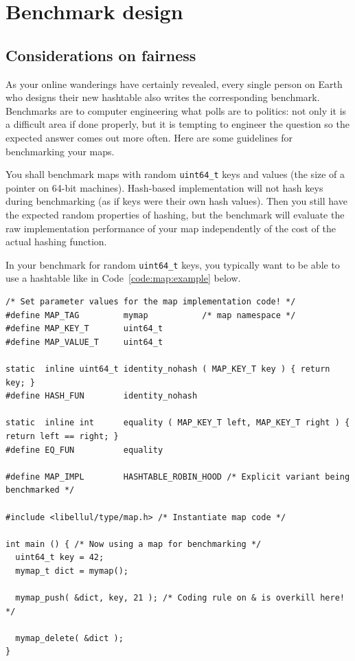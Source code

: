 \chapter{Benchmark design}\label{chap:map:benchmark}

\section*{Considerations on fairness}

As your online wanderings have certainly revealed, every single person on Earth who designs their new hashtable also writes the corresponding benchmark. Benchmarks are to computer engineering what polls are to politics: not only it is a difficult area if done properly, but it is tempting to engineer the question so the expected answer comes out more often. Here are some guidelines for benchmarking your maps.

You shall benchmark maps with random \texttt{uint64\_t} keys and values (the size of a pointer on 64-bit machines). Hash-based implementation will not hash keys during benchmarking (as if keys were their own hash values). Then you still have the expected random properties of hashing, but the benchmark will evaluate the raw implementation performance of your map independently of the cost of the actual hashing function. 

In your benchmark for random \texttt{uint64\_t} keys, you typically want to be able to use a hashtable like in Code~\ref{code:map:example} below.

\begin{code}
  \begin{lstlisting}[style=C]
/* Set parameter values for the map implementation code! */
#define MAP_TAG         mymap           /* map namespace */
#define MAP_KEY_T       uint64_t
#define MAP_VALUE_T     uint64_t

static  inline uint64_t identity_nohash ( MAP_KEY_T key ) { return key; }
#define HASH_FUN        identity_nohash

static  inline int      equality ( MAP_KEY_T left, MAP_KEY_T right ) { return left == right; }
#define EQ_FUN          equality

#define MAP_IMPL        HASHTABLE_ROBIN_HOOD /* Explicit variant being benchmarked */

#include <libellul/type/map.h> /* Instantiate map code */

int main () { /* Now using a map for benchmarking */
  uint64_t key = 42;
  mymap_t dict = mymap();

  mymap_push( &dict, key, 21 ); /* Coding rule on & is overkill here! */

  mymap_delete( &dict );
}
  \end{lstlisting}
  \caption{Instantiating and using a generic map with code templating.}
  \label{code:map:example}
\end{code}

